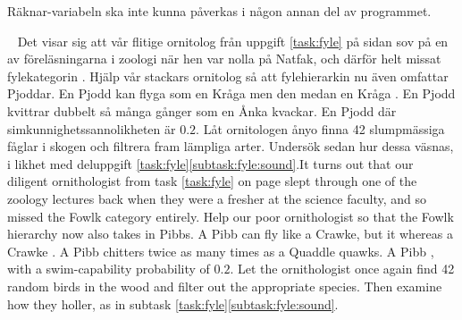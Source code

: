 \SubtaskSolved  Räknar-variabeln ska inte kunna påverkas i någon annan del av programmet.


\QUESTEND






\QUESTBEGIN

\Task  \what~ \ifswedish Det visar sig att vår flitige ornitolog från uppgift \ref{task:fyle} på sidan \pageref{task:fyle} sov på en av föreläsningarna i zoologi när hen var nolla på Natfak, och därför helt missat fylekategorin . Hjälp vår stackars ornitolog så att fylehierarkin nu även omfattar Pjoddar. En Pjodd kan flyga som en Kråga men den  medan en Kråga . En Pjodd kvittrar dubbelt så många gånger som en Ånka kvackar. En Pjodd  där simkunnighetssannolikheten är $0.2$. Låt ornitologen ånyo finna 42 slumpmässiga fåglar i skogen och filtrera fram lämpliga arter. Undersök sedan hur dessa väsnas, i likhet med deluppgift \ref{task:fyle}\ref{subtask:fyle:sound}.\else It turns out that our diligent ornithologist from task \ref{task:fyle} on page \pageref{task:fyle} slept through one of the zoology lectures back when they were a fresher at the science faculty, and so missed the Fowlk category  entirely. Help our poor ornithologist so that the Fowlk hierarchy now also takes in Pibbs. A Pibb can fly like a Crawke, but it  whereas a Crawke . A Pibb chitters twice as many times as a Quaddle quawks. A Pibb , with a swim-capability probability of $0.2$. Let the ornithologist once again find 42 random birds in the wood and filter out the appropriate species. Then examine how they holler, as in subtask \ref{task:fyle}\ref{subtask:fyle:sound}.\fi


\SOLUTION

\TaskSolved \what


